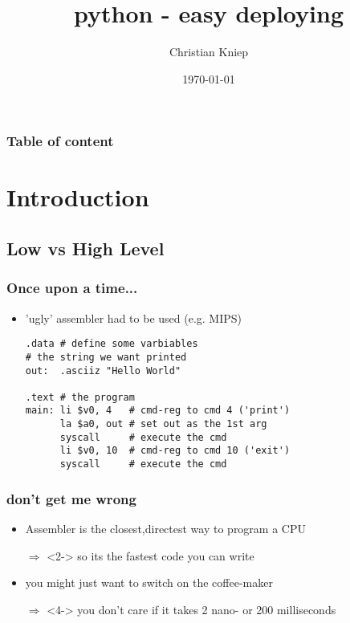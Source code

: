 \documentclass[hyperref={pdfpagelabels=false}]{beamer}
\author{Christian Kniep}
\begin{document}
\title[python - easy deploying]{python - easy deploying}  
\date[\today]{\today} 

\begin{frame}
	\titlepage
\end{frame} 

\begin{frame}
	\frametitle{Table of content}
	\tableofcontents
\end{frame} 


\section{Introduction} 
	\subsection{Low vs High Level}
		\begin{frame}[fragile]
			\frametitle{Once upon a time...}
			\begin{itemize}
				\item<1-> 'ugly' assembler had to be used (e.g. MIPS)
                \begin{verbatim}
.data # define some varbiables
# the string we want printed
out:  .asciiz "Hello World"
 
.text # the program
main: li $v0, 4	  # cmd-reg to cmd 4 ('print')  
      la $a0, out # set out as the 1st arg 
      syscall     # execute the cmd
      li $v0, 10  # cmd-reg to cmd 10 ('exit')
      syscall     # execute the cmd
\end{verbatim}
            \end{itemize}
		\end{frame}
		\begin{frame}
			\frametitle{don't get me wrong}
			\begin{itemize}
				\item<1-> Assembler is the closest,directest way to program a CPU
                \item[$\Rightarrow$]<2-> so its the fastest code you can write
                \item<3-> you might just want to switch on the coffee-maker
                \item[$\Rightarrow$]<4-> you don't care if it takes 2 nano- or 200 milliseconds
            \end{itemize}
        \end{frame}
\end{document}
